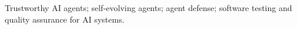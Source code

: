
Trustworthy AI agents; self-evolving agents; agent defense; software testing and quality assurance for AI systems.
